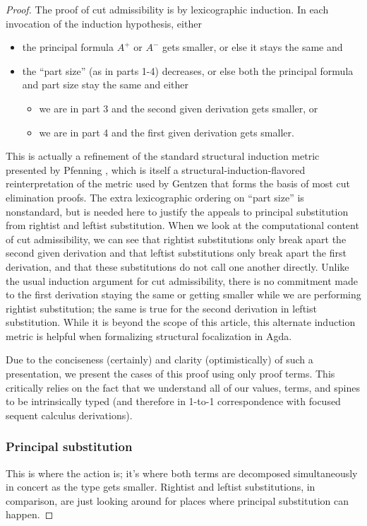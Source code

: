 \documentclass[acmtocl]{robtrans}\pdfoutput=1
\begin{document}
\begin{proof}
The proof of cut admissibility is by lexicographic induction. In each
invocation of the induction hypothesis, either
\begin{itemize}
\item the principal formula $A^+$ or $A^-$ 
gets smaller, or else it stays the same 
and
\item the ``part size'' (as in parts 1-4) decreases, or else both the
  principal formula and part size stay the same and either
\begin{itemize}
\item we are in part 3 and the second given derivation gets smaller,
  or
\item we are in part 4 and the first given derivation gets smaller.
\end{itemize}
\end{itemize}
This is actually a refinement of the standard structural induction
metric presented by Pfenning , which
is itself a structural-induction-flavored reinterpretation of the
metric used by Gentzen  that forms
the basis of most cut elimination proofs. The
extra lexicographic ordering on ``part size'' is nonstandard, but is
needed here to justify the appeals to principal substitution
from rightist and leftist substitution.  When we look at the
computational content of cut admissibility, we can see that rightist
substitutions only break apart the second given derivation and that
leftist substitutions only break apart the first derivation, and that
these substitutions do not call one another directly. Unlike the usual
induction argument for cut admissibility, there is no commitment made
to the first derivation staying the same or getting smaller
while we are performing rightist substitution; the same is true for
the second derivation in leftist substitution. While it is beyond the
scope of this article, this alternate induction metric is helpful
when formalizing structural focalization in Agda.

Due to the conciseness (certainly) and clarity (optimistically) of
such a presentation, we present the cases of this proof using only
proof terms. This critically relies on the fact that we
understand all of our values, terms, and spines to be intrinsically
typed (and therefore in 1-to-1 correspondence with focused sequent
calculus derivations).

\subsubsection*{Principal substitution} 
This is where the action is; it's where both terms are decomposed
simultaneously in concert as the type gets smaller. Rightist and
leftist substitutions, in comparison, are just looking around for
places where principal substitution can happen.


\end{proof}
\end{document}
